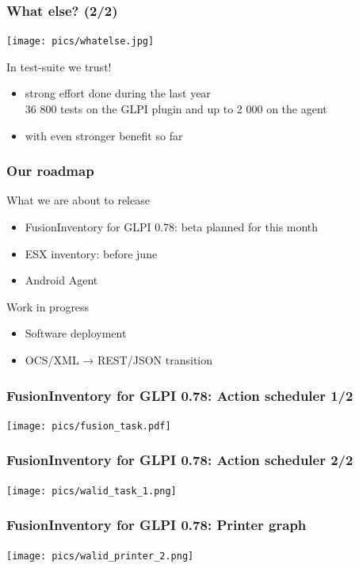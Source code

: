 \documentclass{beamer}
\begin{document}
\begin{frame}
    \frametitle{What else? (2/2)}

    \begin{center}
    \texttt{[image: pics/whatelse.jpg]}
    \end{center}

    \begin{block}{In test-suite we trust!}
        \begin{itemize}
            \item strong effort done during the last year \\
            \small{36 800 tests on the GLPI plugin and up to 2 000 on the agent}
            \item with even stronger benefit so far
        \end{itemize}
    \end{block}
\end{frame}

\begin{frame}
    \frametitle{Our roadmap}

    What we are about to release
    \begin{itemize}
    \item FusionInventory for GLPI 0.78: beta planned for this month
    \item ESX inventory: before june
    \item Android Agent
    \end{itemize}

    Work in progress
    \begin{itemize}
    \item Software deployment
    \item OCS/XML → REST/JSON transition
    \end{itemize}
\end{frame}

\begin{frame}
\frametitle{FusionInventory for GLPI 0.78: Action scheduler 1/2}
    \texttt{[image: pics/fusion\_task.pdf]}
\end{frame}

\begin{frame}
\frametitle{FusionInventory for GLPI 0.78: Action scheduler 2/2}
    \texttt{[image: pics/walid\_task\_1.png]}
\end{frame}

\begin{frame}
\frametitle{FusionInventory for GLPI 0.78: Printer graph}
    \texttt{[image: pics/walid\_printer\_2.png]}
\end{frame}
%
\end{document}
